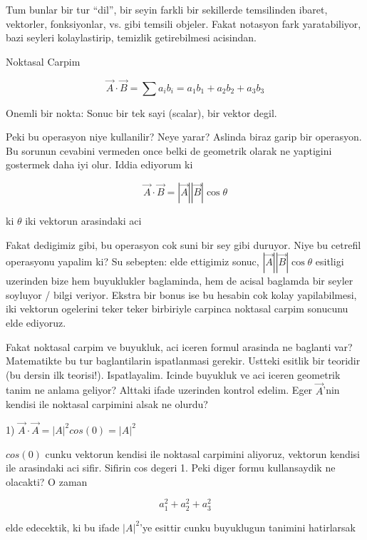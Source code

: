 \documentclass[12pt,fleqn]{article}\usepackage{../common}
\begin{document}
Tum bunlar bir tur ``dil'', bir seyin farkli bir sekillerde temsilinden
ibaret, vektorler, fonksiyonlar, vs. gibi temsili objeler. Fakat notasyon
fark yaratabiliyor, bazi seyleri kolaylastirip, temizlik getirebilmesi
acisindan.

Noktasal Carpim 

\begin{equation}\label{eq1}
\vec{A} \cdot \vec{B} = \sum a_ib_i = a_1b_1 + a_2b_2 + a_3b_3 
\end{equation}

Onemli bir nokta: Sonuc bir tek sayi (scalar), bir vektor degil. 

Peki bu operasyon niye kullanilir? Neye yarar? Aslinda biraz garip bir
operasyon. Bu sorunun cevabini vermeden once belki de geometrik olarak ne
yaptigini gostermek daha iyi olur. Iddia ediyorum ki

\begin{equation}\label{eq2}
\vec{A} \cdot \vec{B} = |\vec{A}||\vec{B}| \cos \theta 
\end{equation}

ki $\theta$ iki vektorun arasindaki aci

Fakat dedigimiz gibi, bu operasyon cok suni bir sey gibi duruyor. Niye bu
cetrefil operasyonu yapalim ki? Su sebepten: elde ettigimiz sonuc,
$|\vec{A}||\vec{B}| \cos \theta $ esitligi uzerinden bize hem buyuklukler
baglaminda, hem de acisal baglamda bir seyler soyluyor / bilgi
veriyor. Ekstra bir bonus ise bu hesabin cok kolay yapilabilmesi, iki
vektorun ogelerini teker teker birbiriyle carpinca noktasal carpim sonucunu
elde ediyoruz. 

Fakat noktasal carpim ve buyukluk, aci iceren formul arasinda ne baglanti
var? Matematikte bu tur baglantilarin ispatlanmasi gerekir. Ustteki esitlik
bir teoridir (bu dersin ilk teorisi!). Ispatlayalim. Icinde buyukluk ve aci
iceren geometrik tanim ne anlama geliyor? Alttaki ifade uzerinden kontrol
edelim. Eger $\vec{A}$'nin kendisi ile noktasal carpimini alsak ne olurdu?

1) $\vec{A} \cdot \vec{A} = |A|^2cos(0) = |A|^2$

$cos(0)$ cunku vektorun kendisi ile noktasal carpimini aliyoruz, vektorun
kendisi ile arasindaki aci sifir. Sifirin cos degeri 1. Peki diger formu
kullansaydik ne olacakti? O zaman

\[ a_1^2 + a_2^2 + a_3^2 \]

elde edecektik, ki bu ifade $|A|^2$'ye esittir cunku buyuklugun tanimini
hatirlarsak
\end{document}
